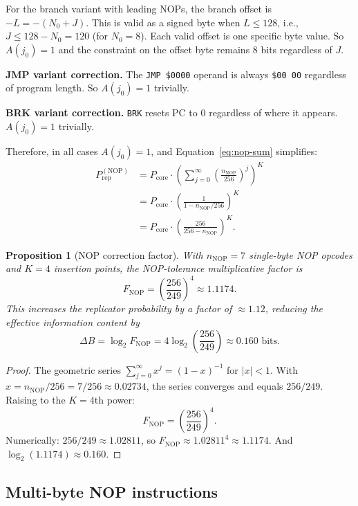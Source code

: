 \documentclass{article}
\newcommand{\hex}[1]{\texttt{\$#1}}
\newcommand{\opcode}[1]{\texttt{#1}}
\newcommand{\Prep}{P_{\mathrm{rep}}}
\newtheorem{proposition}{Proposition}
\begin{document}
For the branch variant with leading NOPs, the branch offset is
$-L = -(N_0 + J)$. This is valid as a signed byte when $L \le 128$,
i.e., $J \le 128 - N_0 = 120$ (for $N_0 = 8$). Each valid offset is
one specific byte value. So $A(j_0) = 1$ and the constraint on the
offset byte remains 8 bits regardless of $J$.

\textbf{JMP variant correction.}
The \opcode{JMP \$0000} operand is always \hex{00 00} regardless of
program length. So $A(j_0) = 1$ trivially.

\textbf{BRK variant correction.}
\opcode{BRK} resets PC to 0 regardless of where it appears.
$A(j_0) = 1$ trivially.

Therefore, in all cases $A(j_0) = 1$, and Equation~\eqref{eq:nop-sum}
simplifies:
\begin{align}
  \Prep^{(\mathrm{NOP})} &= P_{\mathrm{core}} \cdot \left(\sum_{j=0}^{\infty} \left(\frac{n_{\mathrm{NOP}}}{256}\right)^j\right)^K \nonumber \\
  &= P_{\mathrm{core}} \cdot \left(\frac{1}{1 - n_{\mathrm{NOP}}/256}\right)^K \nonumber \\
  &= P_{\mathrm{core}} \cdot \left(\frac{256}{256 - n_{\mathrm{NOP}}}\right)^K. \label{eq:nop-factor}
\end{align}

\begin{proposition}[NOP correction factor]
\label{prop:nop}
With $n_{\mathrm{NOP}} = 7$ single-byte NOP opcodes and $K = 4$
insertion points, the NOP-tolerance multiplicative factor is
\[
  F_{\mathrm{NOP}} = \left(\frac{256}{249}\right)^4 \approx 1.1174.
\]
This increases the replicator probability by a factor of $\approx 1.12$,
reducing the effective information content by
\[
  \Delta B = \log_2 F_{\mathrm{NOP}} = 4 \log_2\!\left(\frac{256}{249}\right) \approx 0.160 \text{ bits}.
\]
\end{proposition}

\begin{proof}
The geometric series $\sum_{j=0}^{\infty} x^j = (1-x)^{-1}$ for
$|x| < 1$. With $x = n_{\mathrm{NOP}}/256 = 7/256 \approx 0.02734$,
the series converges and equals $256/249$. Raising to the $K=4$th power:
\[
  F_{\mathrm{NOP}} = \left(\frac{256}{249}\right)^4.
\]
Numerically: $256/249 \approx 1.02811$, so
$F_{\mathrm{NOP}} \approx 1.02811^4 \approx 1.1174$.
And $\log_2(1.1174) \approx 0.160$.
\end{proof}

\subsection{Multi-byte NOP instructions}
\label{sec:multibyte-nop}
\end{document}
